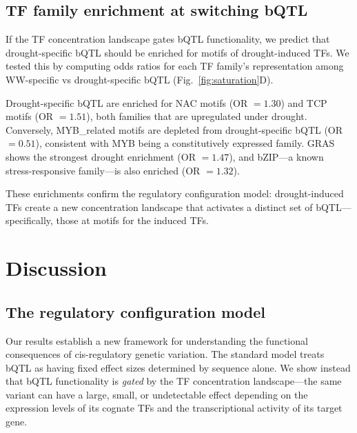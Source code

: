 \documentclass[10pt,letterpaper]{article}
\begin{document}
\subsection*{TF family enrichment at switching bQTL}

If the TF concentration landscape gates bQTL functionality, we predict that
drought-specific bQTL should be enriched for motifs of drought-induced TFs.
We tested this by computing odds ratios for each TF family's representation
among WW-specific vs drought-specific bQTL (Fig.~\ref{fig:saturation}D).

Drought-specific bQTL are enriched for NAC motifs (OR $= 1.30$) and TCP
motifs (OR $= 1.51$), both families that are upregulated under drought.
Conversely, MYB\_related motifs are depleted from drought-specific bQTL
(OR $= 0.51$), consistent with MYB being a constitutively expressed family.
GRAS shows the strongest drought enrichment (OR $= 1.47$), and bZIP---a
known stress-responsive family---is also enriched (OR $= 1.32$).

These enrichments confirm the regulatory configuration model: drought-induced
TFs create a new concentration landscape that activates a distinct set of
bQTL---specifically, those at motifs for the induced TFs.


\section*{Discussion}

\subsection*{The regulatory configuration model}

Our results establish a new framework for understanding the functional
consequences of cis-regulatory genetic variation. The standard model treats
bQTL as having fixed effect sizes determined by sequence alone. We show
instead that bQTL functionality is \emph{gated} by the TF concentration
landscape---the same variant can have a large, small, or undetectable effect
depending on the expression levels of its cognate TFs and the transcriptional
activity of its target gene.
\end{document}
